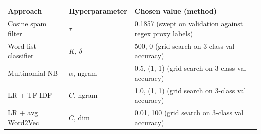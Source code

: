 \begin{tabular}{lll}
\toprule
Approach & Hyperparameter & Chosen value (method) \\
\midrule
Cosine spam filter & $\tau$ & 0.1857 (swept on validation against regex proxy labels) \\
Word-list classifier & $K$, $\delta$ & 500, 0 (grid search on 3-class val accuracy) \\
Multinomial NB & $\alpha$, ngram & 0.5, (1, 1) (grid search on 3-class val accuracy) \\
LR + TF-IDF & $C$, ngram & 1.0, (1, 1) (grid search on 3-class val accuracy) \\
LR + avg Word2Vec & $C$, dim & 0.01, 100 (grid search on 3-class val accuracy) \\
\bottomrule
\end{tabular}
